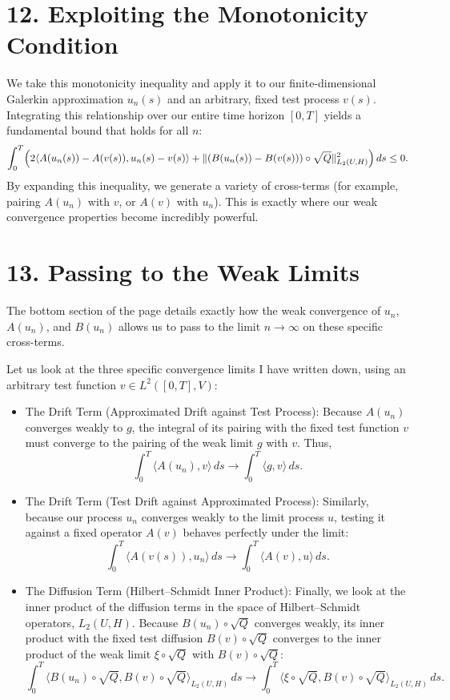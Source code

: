 \documentclass[11pt]{article}
\theoremstyle{definition}
\theoremstyle{remark}
\begin{document}
\section*{12. Exploiting the Monotonicity Condition}
We take this monotonicity inequality and apply it to our finite-dimensional Galerkin approximation $u_n(s)$ and an arbitrary, fixed test process $v(s)$. Integrating this relationship over our entire time horizon $[0,T]$ yields a fundamental bound that holds for all $n$:
\[
  \int_0^T \Bigl( 2\langle A(u_n(s))-A(v(s)), u_n(s)-v(s) \rangle + \|(B(u_n(s))-B(v(s)))\circ \sqrt{Q}\|_{L_2(U,H)}^2 \Bigr)\,ds \le 0.
\]
By expanding this inequality, we generate a variety of cross-terms (for example, pairing $A(u_n)$ with $v$, or $A(v)$ with $u_n$). This is exactly where our weak convergence properties become incredibly powerful.

\section*{13. Passing to the Weak Limits}
The bottom section of the page details exactly how the weak convergence of $u_n$, $A(u_n)$, and $B(u_n)$ allows us to pass to the limit $n\to\infty$ on these specific cross-terms.

Let us look at the three specific convergence limits I have written down, using an arbitrary test function $v\in L^2([0,T],V)$:
\begin{itemize}
\item The Drift Term (Approximated Drift against Test Process): Because $A(u_n)$ converges weakly to $g$, the integral of its pairing with the fixed test function $v$ must converge to the pairing of the weak limit $g$ with $v$. Thus,
\[
  \int_0^T \langle A(u_n), v \rangle\,ds \to \int_0^T \langle g, v \rangle\,ds.
\]
\item The Drift Term (Test Drift against Approximated Process): Similarly, because our process $u_n$ converges weakly to the limit process $u$, testing it against a fixed operator $A(v)$ behaves perfectly under the limit:
\[
  \int_0^T \langle A(v(s)), u_n \rangle\,ds \to \int_0^T \langle A(v), u \rangle\,ds.
\]
\item The Diffusion Term (Hilbert--Schmidt Inner Product): Finally, we look at the inner product of the diffusion terms in the space of Hilbert--Schmidt operators, $L_2(U,H)$. Because $B(u_n)\circ \sqrt{Q}$ converges weakly, its inner product with the fixed test diffusion $B(v)\circ \sqrt{Q}$ converges to the inner product of the weak limit $\xi\circ \sqrt{Q}$ with $B(v)\circ \sqrt{Q}$:
\[
  \int_0^T \langle B(u_n)\circ \sqrt{Q}, B(v)\circ \sqrt{Q} \rangle_{L_2(U,H)}\,ds \to \int_0^T \langle \xi\circ \sqrt{Q}, B(v)\circ \sqrt{Q} \rangle_{L_2(U,H)}\,ds.
\]
\end{itemize}
\end{document}
